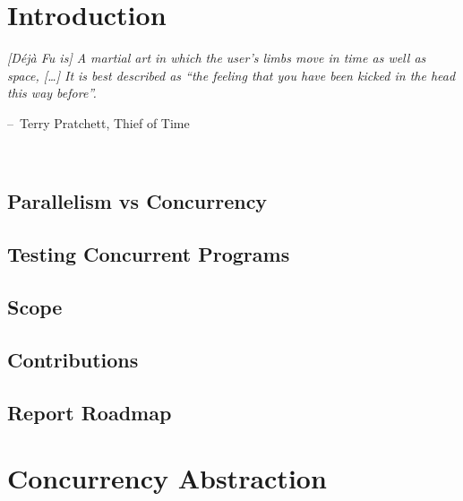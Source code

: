 \documentclass[openright, dottedtoc, headinclude, footinclude=true, a4paper, numbers=noenddot, fontsize=10pt]{scrreprt}
\makeatletter
\newcommand{\mainmatter}{\cleardoublepage\pagenumbering{arabic}}
\newenvironment{chapquote}[2][2em]
  {\setlength{\@tempdima}{#1}%
   \def\chapquote@author{#2}%
   \parshape 1 \@tempdima \dimexpr\textwidth-2\@tempdima\relax%
   \itshape}
  {\par\normalfont\hfill--\
    \chapquote@author\hspace*{\@tempdima}\par\noindent\hrulefill\\[1cm]}
\newcommand{\dejafu}{D\'{e}j\`{a} Fu}
\makeatother
\begin{document}
\tableofcontents


\mainmatter

\section{Introduction}
\label{chap:intro}
\begin{chapquote}{Terry Pratchett, Thief of Time\nocite{pratchett2001}}
  [\dejafu{} is] A martial art in which the user's limbs move in time
  as well as space, [\ldots] It is best described as ``the feeling
  that you have been kicked in the head this way before''.
\end{chapquote}



  \subsection{Parallelism vs Concurrency}
  \label{sec:intro-parconc}
  

  \subsection{Testing Concurrent Programs}
  \label{sec:intro-testing}
  

  \subsection{Scope}
  \label{sec:intro-scope}
  

  \subsection{Contributions}
  \label{sec:intro-contribs}
  

  \subsection{Report Roadmap}
  \label{sec:intro-roadmap}
  

\section{Concurrency Abstraction}
\label{chap:abstraction}

\end{document}
